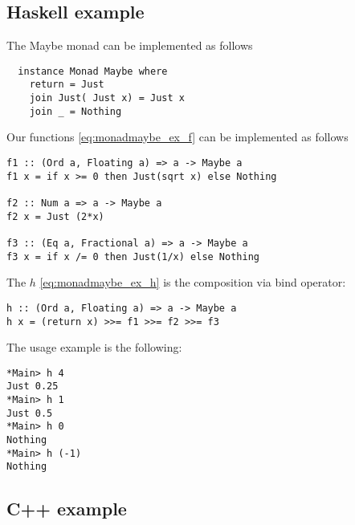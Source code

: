 \subsection{Haskell example}

\begin{example}
\label{ex:maybe_monad_haskell}
The Maybe monad can be implemented as follows
\begin{verbatim}
  instance Monad Maybe where
    return = Just
    join Just( Just x) = Just x
    join _ = Nothing
\end{verbatim} 

Our functions \eqref{eq:monadmaybe_ex_f} can be implemented as follows
\begin{verbatim}
f1 :: (Ord a, Floating a) => a -> Maybe a
f1 x = if x >= 0 then Just(sqrt x) else Nothing 

f2 :: Num a => a -> Maybe a
f2 x = Just (2*x)

f3 :: (Eq a, Fractional a) => a -> Maybe a
f3 x = if x /= 0 then Just(1/x) else Nothing
\end{verbatim}

The $h$ \eqref{eq:monadmaybe_ex_h} is the composition via bind
operator:
\begin{verbatim}
h :: (Ord a, Floating a) => a -> Maybe a
h x = (return x) >>= f1 >>= f2 >>= f3
\end{verbatim}

The usage example is the following:
\begin{verbatim}
*Main> h 4
Just 0.25
*Main> h 1
Just 0.5
*Main> h 0
Nothing
*Main> h (-1)
Nothing
\end{verbatim}

\end{example}

\subsection{C++ example}

